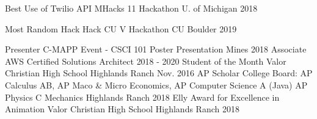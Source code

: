 

\begin{cvhonors}

  \cvhonor
    {Best Use of Twilio API} %
    {MHacks 11 Hackathon}
    {U. of Michigan} %
    {2018} %

  \cvhonor
    {Most Random Hack} %
    {Hack CU V Hackathon}
    {CU Boulder} %
    {2019} %

    \cvhonor
    {Presenter} %
    {C-MAPP Event - CSCI 101 Poster Presentation}
    {Mines} %
    {2018} %
  \cvhonor
    {Associate} %
    {AWS Certified Solutions Architect }
    {} %
    {2018 - 2020} %
  \cvhonor
    {Student of the Month} %
    {Valor Christian High School}
    {Highlands Ranch} %
    {Nov. 2016} %
    \cvhonor
    {AP Scholar} %
    {College Board: AP Calculus AB, AP Maco \& Micro Economics, AP
      Computer Science A (Java) AP Physics C Mechanics}
    {Highlands Ranch} %
    {2018} %
    \cvhonor
    {Elly Award for Excellence in Animation} %
    {Valor Christian High School}
    {Highlands Ranch} %
    {2018} %
    
\end{cvhonors}
